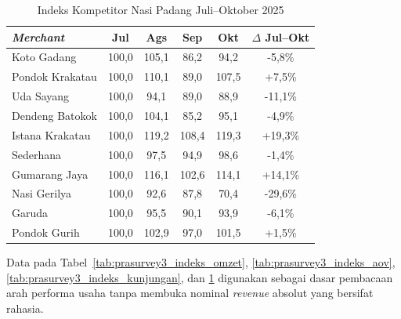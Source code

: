 \begin{table}[h!]
    \centering
    \small
    \caption{Indeks Kompetitor Nasi Padang Juli--Oktober 2025}
    \label{tab:prasurvey3_indeks_kompetitor}
    \begin{tabularx}{\textwidth}{p{4cm}ccccc}
        \toprule
        \textbf{\textit{Merchant}} & \textbf{Jul} & \textbf{Ags} & \textbf{Sep} & \textbf{Okt} & \textbf{$\Delta$ Jul--Okt} \\
        \midrule
        Koto Gadang                & 100,0        & 105,1        & 86,2         & 94,2         & -5,8\%                     \\
        Pondok Krakatau            & 100,0        & 110,1        & 89,0         & 107,5        & +7,5\%                     \\
        Uda Sayang                 & 100,0        & 94,1         & 89,0         & 88,9         & -11,1\%                    \\
        Dendeng Batokok            & 100,0        & 104,1        & 85,2         & 95,1         & -4,9\%                     \\
        Istana Krakatau            & 100,0        & 119,2        & 108,4        & 119,3        & +19,3\%                    \\
        Sederhana                  & 100,0        & 97,5         & 94,9         & 98,6         & -1,4\%                     \\
        Gumarang Jaya              & 100,0        & 116,1        & 102,6        & 114,1        & +14,1\%                    \\
        Nasi Gerilya               & 100,0        & 92,6         & 87,8         & 70,4         & -29,6\%                    \\
        Garuda                     & 100,0        & 95,5         & 90,1         & 93,9         & -6,1\%                     \\
        Pondok Gurih               & 100,0        & 102,9        & 97,0         & 101,5        & +1,5\%                     \\
        \bottomrule
    \end{tabularx}
\end{table}

Data pada Tabel~\ref{tab:prasurvey3_indeks_omzet}, \ref{tab:prasurvey3_indeks_aov}, \ref{tab:prasurvey3_indeks_kunjungan}, dan \ref{tab:prasurvey3_indeks_kompetitor} digunakan sebagai dasar pembacaan arah performa usaha tanpa membuka nominal \textit{revenue} absolut yang bersifat rahasia.
